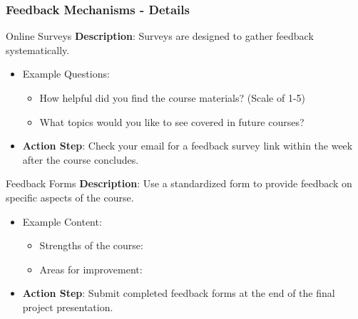 \documentclass[aspectratio=169]{beamer}
\begin{document}
\begin{frame}[fragile]
  \frametitle{Feedback Mechanisms - Details}
  \begin{block}{Online Surveys}
    \textbf{Description}: Surveys are designed to gather feedback systematically. 
    \begin{itemize}
      \item Example Questions:
      \begin{itemize}
        \item How helpful did you find the course materials? (Scale of 1-5)
        \item What topics would you like to see covered in future courses?
      \end{itemize}
      \item \textbf{Action Step}: Check your email for a feedback survey link within the week after the course concludes.
    \end{itemize}
  \end{block}

  \begin{block}{Feedback Forms}
    \textbf{Description}: Use a standardized form to provide feedback on specific aspects of the course.
    \begin{itemize}
      \item Example Content:
      \begin{itemize}
        \item Strengths of the course:
        \item Areas for improvement:
      \end{itemize}
      \item \textbf{Action Step}: Submit completed feedback forms at the end of the final project presentation.
    \end{itemize}
  \end{block}
\end{frame}
\end{document}
